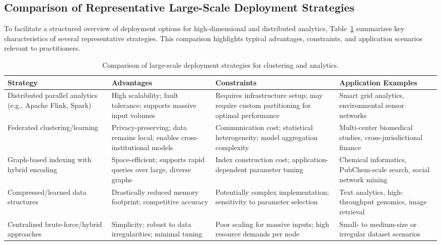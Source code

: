 \documentclass[11pt]{article}
\begin{document}
\subsection{Comparison of Representative Large-Scale Deployment Strategies}

To facilitate a structured overview of deployment options for high-dimensional and distributed analytics, Table~\ref{tab:deployment_strategies} summarizes key characteristics of several representative strategies. This comparison highlights typical advantages, constraints, and application scenarios relevant to practitioners.

\begin{table}[ht]
  \centering
  \caption{Comparison of large-scale deployment strategies for clustering and analytics.}
  \label{tab:deployment_strategies}
  \begin{tabular}{|p{3.8cm}|p{4.2cm}|p{3.5cm}|p{4cm}|}
    \hline
    \textbf{Strategy} & \textbf{Advantages} & \textbf{Constraints} & \textbf{Application Examples} \\
    \hline
    Distributed parallel analytics (e.g., Apache Flink, Spark) & High scalability; fault tolerance; supports massive input volumes & Requires infrastructure setup; may require custom partitioning for optimal performance & Smart grid analytics, environmental sensor networks \\
    \hline
    Federated clustering/learning & Privacy-preserving; data remains local; enables cross-institutional models & Communication cost; statistical heterogeneity; model aggregation complexity & Multi-center biomedical studies, cross-jurisdictional finance \\
    \hline
    Graph-based indexing with hybrid encoding & Space-efficient; supports rapid queries over large, diverse graphs & Index construction cost; application-dependent parameter tuning & Chemical informatics, PubChem-scale search, social network mining \\
    \hline
    Compressed/learned data structures & Drastically reduced memory footprint; competitive accuracy & Potentially complex implementation; sensitivity to parameter selection & Text analytics, high-throughput genomics, image retrieval \\
    \hline
    Centralized brute-force/hybrid approaches & Simplicity; robust to data irregularities; minimal tuning & Poor scaling for massive inputs; high resource demands per node & Small- to medium-size or irregular dataset scenarios \\
    \hline
  \end{tabular}
\end{table}
\end{document}
